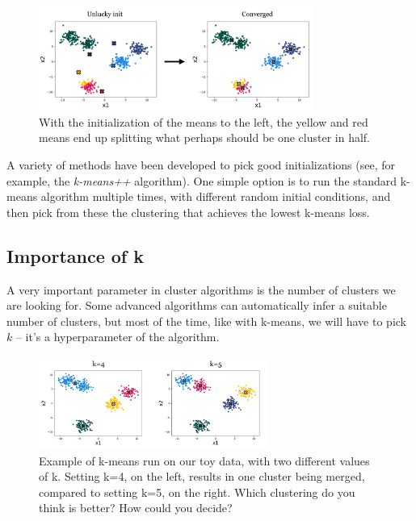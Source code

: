 \begin{figure}[h]
  \centering
  \includegraphics[width=0.8\textwidth]{./figures/kmeans_init.png}
  \caption{With the initialization of the means to the left, the
    yellow and red means end up splitting what perhaps should be one
    cluster in half.}
  \label{fig:kmeans_init}
\end{figure}

A variety of methods have been developed to pick good initializations
(see, for example, the \textit{k-means++} algorithm). One simple
option is to run the standard k-means algorithm multiple times, with
different random initial conditions, and then pick from these the
clustering that achieves the lowest k-means loss.

\subsection{Importance of k}\label{sec-importance_of_k}

A very important parameter in cluster algorithms is the number of
clusters we are looking for. Some advanced algorithms can
automatically infer a suitable number of clusters, but most of the
time, like with k-means, we will have to pick $k$ -- it's a
hyperparameter of the algorithm.

\begin{figure}[h]
  \centering
  \includegraphics[width=0.67\textwidth]{figures/effect_of_k.png}
  \caption{Example of k-means run on our toy data, with two
    different values of k. Setting k=4, on the left, results in one
    cluster being merged, compared to setting k=5, on the
    right. Which clustering do you think is better? How could you
    decide?}
  \label{fig:effect_of_k}
\end{figure}

